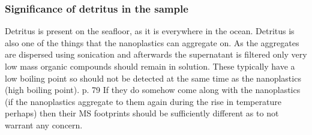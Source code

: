 \documentclass[twocolumn,a4paper,aps,amsmath,amssymb,floatfix,superscriptaddress]{revtex4-2}
\begin{document}
	\subsubsection{Significance of detritus in the sample}
	Detritus is present on the seafloor, as it is everywhere in the ocean. Detritus is also one of the things that the nanoplastics can aggregate on. As the aggregates are dispersed using sonication and afterwards the supernatant is filtered only very low mass organic compounds should remain in solution. These typically have a low boiling point so should not be detected at the same time as the nanoplastics (high boiling point). \cite{McMurry}{p. 79} If they do somehow come along with the nanoplastics (if the nanoplastics aggregate to them again during the rise in temperature perhaps) then their MS footprints should be sufficiently different as to not warrant any concern.
\end{document}
